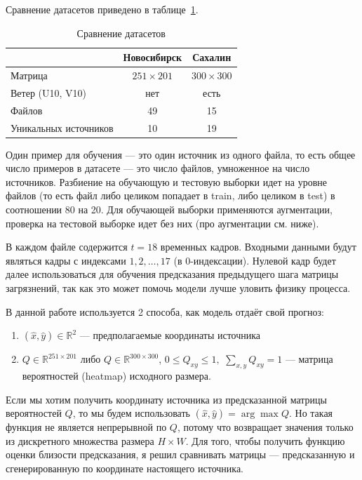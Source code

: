 \documentclass[12pt]{article}
\newcommand{\RR}{\mathbb{R}}
\begin{document}
Сравнение датасетов приведено в таблице~\ref{tab:datasets}.

\begin{table}[ht]
    \centering
    \caption{Сравнение датасетов}
    \label{tab:datasets}
    \begin{tabular}{lcc}
      \toprule
                         & \textbf{Новосибирск} & \textbf{Сахалин} \\
      \midrule
      Матрица              & $251 \times 201$ & $300 \times 300$ \\
      Ветер (U10, V10)   & нет              & есть \\
      Файлов             & 49               & 15 \\
      Уникальных источников & 10               & 19 \\
      \bottomrule
    \end{tabular}
\end{table}

Один пример для обучения --- это один источник из одного файла, то есть общее число примеров в датасете --- это число файлов, умноженное на число источников. Разбиение на обучающую и тестовую выборки идет на уровне файлов (то есть файл либо целиком попадает в train, либо целиком в test) в соотношении 80 на 20. Для обучающей выборки применяются аугментации, проверка на тестовой выборке идет без них (про аугментации см. ниже).

В каждом файле содержится $t=18$ временных кадров. Входными данными будут являться кадры с индексами $1, 2, \ldots, 17$ (в 0-индексации). Нулевой кадр будет далее использоваться для обучения предсказания предыдущего шага матрицы загрязнений, так как это может помочь модели лучше уловить физику процесса.

В данной работе используется 2 способа, как модель отдаёт свой прогноз:

\begin{enumerate}
    \item $(\hat x, \hat y) \in \RR^2$ --- предполагаемые координаты источника
    \item $Q \in \RR^{251 \times 201}$ либо $Q \in \RR^{300 \times 300}$, $0 \le Q_{xy} \le 1, \,\, \sum_{x, y} Q_{xy} = 1$ --- матрица вероятностей (heatmap) исходного размера.
\end{enumerate}

Если мы хотим получить координату источника из предсказанной матрицы вероятностей $Q$, то мы будем использовать $(\hat x, \hat y) = \arg\max Q$. 
Но такая функция не является непрерывной по $Q$, потому что возвращает значения только из дискретного множества размера $H \times W$. 
Для того, чтобы получить функцию оценки близости предсказания, я решил сравнивать матрицы --- предсказанную и сгенерированную по координате настоящего источника.
\end{document}
